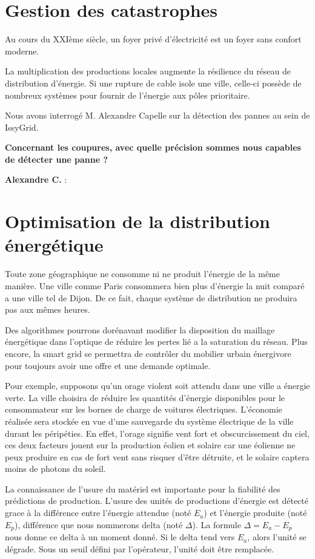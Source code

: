 \section{Gestion des catastrophes}

Au cours du XXIème siècle, un foyer privé d'électricité est un foyer sans confort moderne.

La multiplication des productions locales augmente la résilience du réseau de distribution d'énergie.
Si une rupture de cable isole une ville, celle-ci possède de nombreux systèmes pour fournir
de l'énergie aux pôles prioritaire.

Nous avons interrogé M. Alexandre Capelle sur la détection des pannes au sein de IssyGrid.

\textbf{Concernant les coupures, avec quelle précision sommes nous capables de détecter une panne ?}

\textbf{Alexandre C.} :


\section{Optimisation de la distribution énergétique}

Toute zone géographique ne consomme ni ne produit l'énergie de la même manière.
Une ville comme Paris consommera bien plus d'énergie la nuit comparé a une ville tel de Dijon.
De ce fait, chaque système de distribution ne produira pas aux mêmes heures.

Des algorithmes pourrons dorénavant modifier la disposition du maillage énergétique dans l'optique
de réduire les pertes lié a la saturation du réseau. Plus encore, la smart grid se permettra de contrôler
du mobilier urbain énergivore pour toujours avoir une offre et une demande optimale.

Pour exemple, supposons qu'un orage violent soit attendu dans une ville a énergie verte.
La ville choisira de réduire les quantités d'énergie disponibles pour le consommateur sur les bornes
de charge de voitures électriques.
L'économie réalisée sera stockée en vue d'une sauvegarde du système électrique de la ville durant les péripéties.
En effet, l'orage signifie vent fort et obscurcissement du ciel, ces deux facteurs jouent sur la production
éolien et solaire car une éolienne ne peux produire en cas de fort vent sans risquer d'être détruite, et le solaire
captera moins de photons du soleil.

La connaissance de l'usure du matériel est importante pour la fiabilité des prédictions de production.
L'usure des unités de productions d'énergie est détecté grace à la différence entre l'énergie attendue
(noté $E_a$) et l'énergie produite (noté $E_p$), différence que nous nommerons delta (noté $\Delta$).
La formule $\Delta = E_a - E_p$ nous donne ce delta à un moment donné.
Si le delta tend vers $E_a$, alors l'unité se dégrade. Sous un seuil défini par l'opérateur,
l'unité doit être remplacée.

